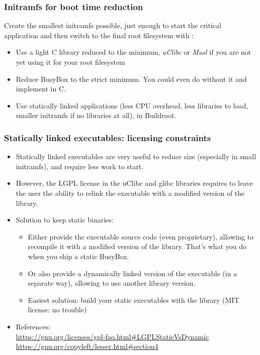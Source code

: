 \begin{frame}
\frametitle{Initramfs for boot time reduction}
Create the smallest initramfs possible, just enough to start the critical
application and then switch to the final root filesystem with
:
\begin{itemize}
\item Use a light C library reduced to the minimum,
      {\em uClibc} or {\em Musl} if you are not yet using it for
      your root filesystem
\item Reduce BusyBox to the strict minimum.
      You could even do without it and implement  in C.
\item Use statically linked applications (less CPU overhead, less
      libraries to load, smaller initramfs if no libraries at all),
       in Buildroot.
\end{itemize}
\end{frame}

\begin{frame}
\frametitle{Statically linked executables: licensing constraints}
\begin{itemize}
\item Statically linked executables are very useful to reduce size
      (especially in small initramfs), and require less work to start.
\item However, the LGPL license in the uClibc and glibc libraries
      requires to leave the user the ability to relink the executable
      with a modified version of the library.
\item Solution to keep static binaries:
      \begin{itemize}
      \item Either provide the executable source code (even
            proprietary), allowing to recompile it with a modified
            version of the library. That's what you do when
            you ship a static BusyBox.
      \item Or also provide a dynamically linked version of the
	    executable (in a separate way), allowing to use another
            library version.
      \item Easiest solution: build your static executables with the
	     library (MIT license: no trouble)
      \end{itemize}
\item References: \\
      {\footnotesize
      \url{https://gnu.org/licenses/gpl-faq.html\#LGPLStaticVsDynamic} \\
      \url{https://gnu.org/copyleft/lesser.html\#section4}
      }
\end{itemize}
\end{frame}

